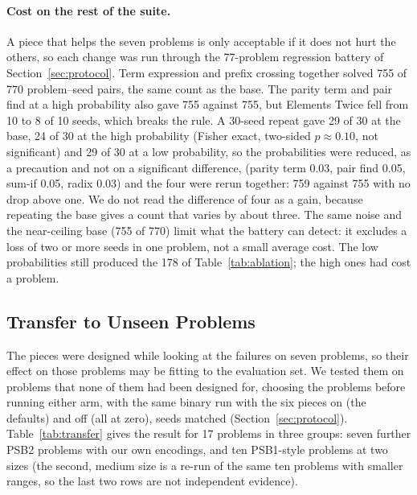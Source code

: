 \documentclass[sigconf,nonacm]{acmart}
\begin{document}
\paragraph{Cost on the rest of the suite.}
A piece that helps the seven problems is only acceptable if it does not hurt the others, so each change was run through the
77-problem regression battery of Section~\ref{sec:protocol}. Term expression and prefix crossing together solved 755 of 770 problem--seed
pairs, the same count as the base. The parity term and pair find at a high probability also gave 755 against 755, but
Elements Twice fell from 10 to 8 of 10 seeds, which breaks the rule. A 30-seed repeat gave 29 of 30 at the base, 24 of 30 at the high probability (Fisher exact, two-sided $p \approx 0.10$, not significant)
and 29 of 30 at a low probability, so the probabilities were reduced, as a precaution and not on a significant difference, (parity term 0.03, pair find 0.05, sum-if 0.05, radix 0.03) and the four were
rerun together: 759 against 755 with no drop above one. We do not read the difference of four as a gain, because repeating the base gives a
count that varies by about three. The same noise and the near-ceiling base (755 of 770) limit what the battery can detect: it excludes a loss of two or more seeds in one problem, not a small average cost. The low probabilities still produced the 178 of Table~\ref{tab:ablation}; the high ones had cost a problem.

\subsection{Transfer to Unseen Problems}
\label{sec:transfer}
The pieces were designed while looking at the failures on seven problems, so their effect on those problems may be fitting to the evaluation set. We
tested them on problems that none of them had been designed for, choosing the problems before running either arm, with the same
binary run with the six pieces on (the defaults) and off (all at zero), seeds matched (Section~\ref{sec:protocol}). Table~\ref{tab:transfer} gives the
result for 17 problems in three groups: seven further PSB2 problems with our own encodings, and ten PSB1-style problems at
two sizes (the second, medium size is a re-run of the same ten problems with smaller ranges, so the last two rows are not independent evidence).
\end{document}
